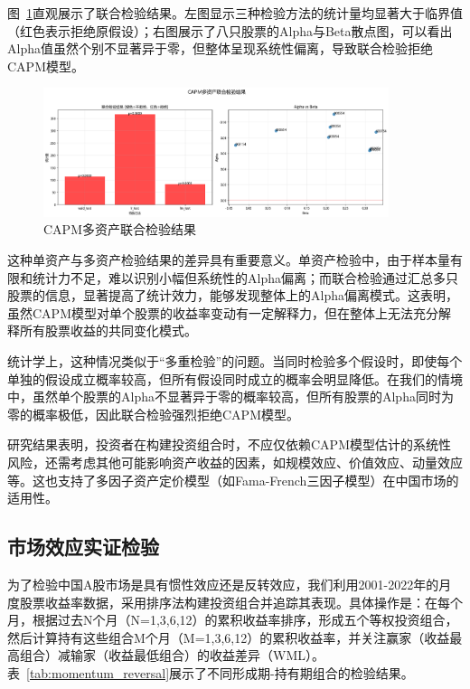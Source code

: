 \documentclass[12pt, a4paper]{article}
\begin{document}
图~\ref{fig:capm_joint_test}直观展示了联合检验结果。左图显示三种检验方法的统计量均显著大于临界值（红色表示拒绝原假设）；右图展示了八只股票的Alpha与Beta散点图，可以看出Alpha值虽然个别不显著异于零，但整体呈现系统性偏离，导致联合检验拒绝CAPM模型。

\begin{figure}[htbp]
\centering
\includegraphics[width=0.9\textwidth]{./img/capm_joint_test_results.png}
\caption{CAPM多资产联合检验结果}
\label{fig:capm_joint_test}
\end{figure}

这种单资产与多资产检验结果的差异具有重要意义。单资产检验中，由于样本量有限和统计力不足，难以识别小幅但系统性的Alpha偏离；而联合检验通过汇总多只股票的信息，显著提高了统计效力，能够发现整体上的Alpha偏离模式。这表明，虽然CAPM模型对单个股票的收益率变动有一定解释力，但在整体上无法充分解释所有股票收益的共同变化模式。

统计学上，这种情况类似于“多重检验”的问题。当同时检验多个假设时，即使每个单独的假设成立概率较高，但所有假设同时成立的概率会明显降低。在我们的情境中，虽然单个股票的Alpha不显著异于零的概率较高，但所有股票的Alpha同时为零的概率极低，因此联合检验强烈拒绝CAPM模型。

研究结果表明，投资者在构建投资组合时，不应仅依赖CAPM模型估计的系统性风险，还需考虑其他可能影响资产收益的因素，如规模效应、价值效应、动量效应等。这也支持了多因子资产定价模型（如Fama-French三因子模型）在中国市场的适用性。

\subsection{市场效应实证检验}

为了检验中国A股市场是具有惯性效应还是反转效应，我们利用2001-2022年的月度股票收益率数据，采用排序法构建投资组合并追踪其表现。具体操作是：在每个月，根据过去N个月（N=1,3,6,12）的累积收益率排序，形成五个等权投资组合，然后计算持有这些组合M个月（M=1,3,6,12）的累积收益率，并关注赢家（收益最高组合）减输家（收益最低组合）的收益差异（WML）。表~\ref{tab:momentum_reversal}展示了不同形成期-持有期组合的检验结果。
\end{document}

